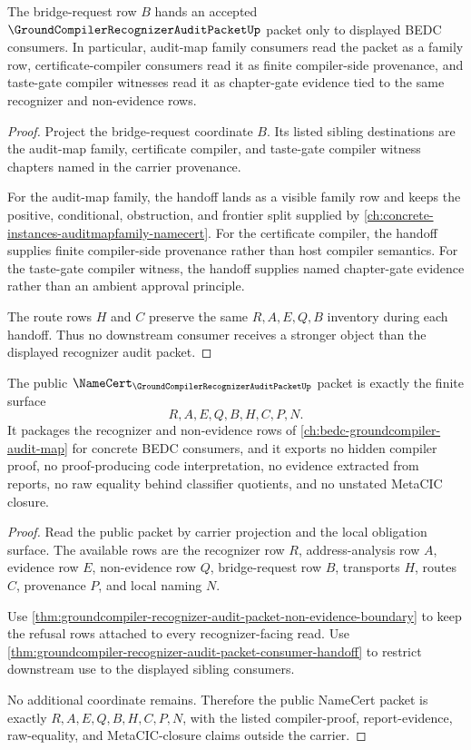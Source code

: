 \begin{theorem}
\label{thm:groundcompiler-recognizer-audit-packet-consumer-handoff}
The bridge-request row $B$ hands an accepted $\GroundCompilerRecognizerAuditPacketUp$ packet only to displayed BEDC consumers. In particular, audit-map family consumers read the packet as a family row, certificate-compiler consumers read it as finite compiler-side provenance, and taste-gate compiler witnesses read it as chapter-gate evidence tied to the same recognizer and non-evidence rows.
\end{theorem}
\begin{proof}
Project the bridge-request coordinate $B$. Its listed sibling destinations are the audit-map family, certificate compiler, and taste-gate compiler witness chapters named in the carrier provenance.

For the audit-map family, the handoff lands as a visible family row and keeps the positive, conditional, obstruction, and frontier split supplied by \autoref{ch:concrete-instances-auditmapfamily-namecert}. For the certificate compiler, the handoff supplies finite compiler-side provenance rather than host compiler semantics. For the taste-gate compiler witness, the handoff supplies named chapter-gate evidence rather than an ambient approval principle.

The route rows $H$ and $C$ preserve the same $R,A,E,Q,B$ inventory during each handoff. Thus no downstream consumer receives a stronger object than the displayed recognizer audit packet.
\end{proof}

\begin{theorem}
\label{thm:groundcompiler-recognizer-audit-packet-namecert}
The public $\NameCert_{\GroundCompilerRecognizerAuditPacketUp}$ packet is exactly the finite surface
$$
R,A,E,Q,B,H,C,P,N.
$$
It packages the recognizer and non-evidence rows of \autoref{ch:bedc-groundcompiler-audit-map} for concrete BEDC consumers, and it exports no hidden compiler proof, no proof-producing code interpretation, no evidence extracted from reports, no raw equality behind classifier quotients, and no unstated MetaCIC closure.
\end{theorem}
\begin{proof}
Read the public packet by carrier projection and the local obligation surface. The available rows are the recognizer row $R$, address-analysis row $A$, evidence row $E$, non-evidence row $Q$, bridge-request row $B$, transports $H$, routes $C$, provenance $P$, and local naming $N$.

Use \autoref{thm:groundcompiler-recognizer-audit-packet-non-evidence-boundary} to keep the refusal rows attached to every recognizer-facing read. Use \autoref{thm:groundcompiler-recognizer-audit-packet-consumer-handoff} to restrict downstream use to the displayed sibling consumers.

No additional coordinate remains. Therefore the public NameCert packet is exactly $R,A,E,Q,B,H,C,P,N$, with the listed compiler-proof, report-evidence, raw-equality, and MetaCIC-closure claims outside the carrier.
\end{proof}

